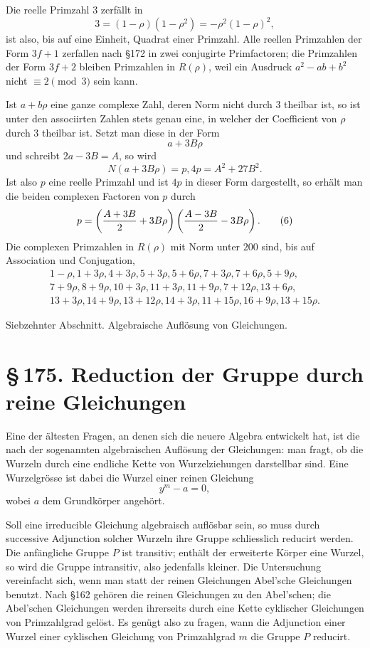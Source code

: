 \documentclass[11pt]{article}
\providecommand{\sect}[2]{\section*{\S\,#1. #2}}
\begin{document}
Die reelle Primzahl $3$ zerfällt in
\[
        3=(1-
\rho)(1-
\rho^2)=-\rho^2(1-
\rho)^2,                         \tag{4}
\]
ist also, bis auf eine Einheit, Quadrat einer Primzahl. Alle reellen Primzahlen der Form $3f+1$ zerfallen nach §172 in zwei conjugirte Primfactoren; die Primzahlen der Form $3f+2$ bleiben Primzahlen in $R(\rho)$, weil ein Ausdruck $a^2-ab+b^2$ nicht $\equiv2\pmod3$ sein kann.

Ist $a+b\rho$ eine ganze complexe Zahl, deren Norm nicht durch $3$ theilbar ist, so ist unter den associirten Zahlen stets genau eine, in welcher der Coefficient von $\rho$ durch $3$ theilbar ist. Setzt man diese in der Form
\[
        a+3B\rho
\]
und schreibt $2a-3B=A$, so wird
\[
        N(a+3B\rho)=p,
        4p=A^2+27B^2.                                                  \tag{5}
\]
Ist also $p$ eine reelle Primzahl und ist $4p$ in dieser Form dargestellt, so erhält man die beiden complexen Factoren von $p$ durch
\[
        p=\left({A+3B\over2}+3B\rho\right)
          \left({A-3B\over2}-3B\rho\right).                            \tag{6}
\]
Die complexen Primzahlen in $R(\rho)$ mit Norm unter $200$ sind, bis auf Association und Conjugation,
\[
\begin{gathered}
1-
\rho,
1+3\rho,
4+3\rho,
5+3\rho,
5+6\rho,
7+3\rho,
7+6\rho,
5+9\rho,\\
7+9\rho,
8+9\rho,
10+3\rho,
11+3\rho,
11+9\rho,
7+12\rho,
13+6\rho,\\
13+3\rho,
14+9\rho,
13+12\rho,
14+3\rho,
11+15\rho,
16+9\rho,
13+15\rho.
\end{gathered}
\]

\begin{center}\large Siebzehnter Abschnitt. Algebraische Auflösung von Gleichungen.\end{center}

\sect{175}{Reduction der Gruppe durch reine Gleichungen}

Eine der ältesten Fragen, an denen sich die neuere Algebra entwickelt hat, ist die nach der sogenannten algebraischen Auflösung der Gleichungen: man fragt, ob die Wurzeln durch eine endliche Kette von Wurzelziehungen darstellbar sind. Eine Wurzelgrösse ist dabei die Wurzel einer reinen Gleichung
\[
        y^m-a=0,                                                        \tag{1}
\]
wobei $a$ dem Grundkörper angehört.

Soll eine irreducible Gleichung algebraisch auflösbar sein, so muss durch successive Adjunction solcher Wurzeln ihre Gruppe schliesslich reducirt werden. Die anfängliche Gruppe $P$ ist transitiv; enthält der erweiterte Körper eine Wurzel, so wird die Gruppe intransitiv, also jedenfalls kleiner. Die Untersuchung vereinfacht sich, wenn man statt der reinen Gleichungen Abel'sche Gleichungen benutzt. Nach §162 gehören die reinen Gleichungen zu den Abel'schen; die Abel'schen Gleichungen werden ihrerseits durch eine Kette cyklischer Gleichungen von Primzahlgrad gelöst. Es genügt also zu fragen, wann die Adjunction einer Wurzel einer cyklischen Gleichung von Primzahlgrad $m$ die Gruppe $P$ reducirt.
\end{document}
